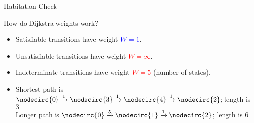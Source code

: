 \begin{frame}{Habitation Check}

  How do Dijkstra weights work?

  \only<2,3>{\scalebox{0.8}{}}%

  \begin{itemize}
  \item<2->{Satisfiable transitions have weight \textcolor{blue}{$W\!=1$}.}
  \item<3->{Unsatisfiable transitions have weight \textcolor{red}{$W\!=\infty$}.}
  \item<4->{Indeterminate transitions have weight \textcolor{red}{$W\!=5$} (number of states).}
  \item<5>{Shortest path is $\nodecirc{0} \xrightarrow{1} \nodecirc{3} \xrightarrow{1} \nodecirc{4}  \xrightarrow{1} \nodecirc{2}$; length is $3$\\
  Longer path is $\nodecirc{0}\xrightarrow{5}\nodecirc{1}\xrightarrow{1}\nodecirc{2}$; length is $6$}
  \end{itemize}
\end{frame}



